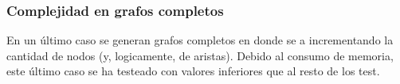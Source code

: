 \subsubsection{Complejidad en grafos completos}
En un último caso se generan grafos completos en donde se a incrementando la cantidad de nodos (y, logicamente, de aristas). Debido al consumo de memoria, este último caso se ha testeado con valores inferiores que al resto de los test.



